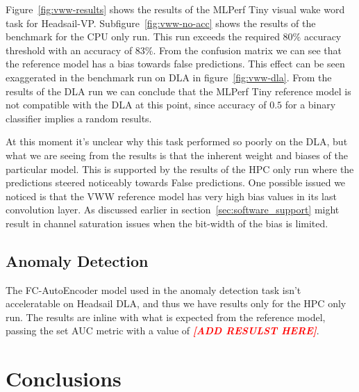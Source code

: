 \documentclass[12pt,a4paper,english
]{tunithesis}
\newcommand{\fixthis}[1]{\textbf{\textit{\textcolor{red}{[#1]}}}}
\begin{document}
Figure~\ref{fig:vww-results} shows the results of the MLPerf Tiny visual wake word task for Headsail-VP. Subfigure~\ref{fig:vww-no-acc} shows the results of the benchmark for the CPU only run. This run exceeds the required $80\%$ accuracy threshold with an accuracy of $83\%$. From the confusion matrix we can see that the reference model has a bias towards false predictions. This effect can be seen exaggerated in the benchmark run on DLA in figure~\ref{fig:vww-dla}. From the results of the DLA run we can conclude that the MLPerf Tiny reference model is not compatible with the DLA at this point, since accuracy of $0.5$ for a binary classifier implies a random results.

At this moment it's unclear why this task performed so poorly on the DLA, but what we are seeing from the results is that the inherent weight and biases of the particular model. This is supported by the results of the HPC only run where the predictions steered noticeably towards False predictions. One possible issued we noticed is that the VWW reference model has very high bias values in its last convolution layer. As discussed earlier in section~\ref{sec:software_support} might result in channel saturation issues when the bit-width of the bias is limited.

\section{Anomaly Detection}
The FC-AutoEncoder model used in the anomaly detection task isn't acceleratable on Headsail DLA, and thus we have results only for the HPC only run. The results are inline with what is expected from the reference model, passing the set AUC metric with a value of \fixthis{ADD RESULST HERE}.

\chapter{Conclusions}
\label{ch:conclusions}
\end{document}
